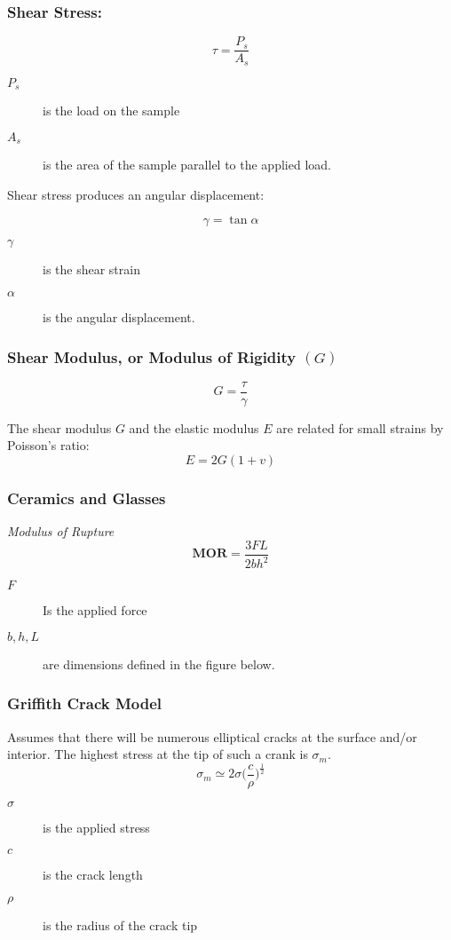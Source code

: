 \documentclass[10pt,letterpaper]{article}
\begin{document}
	\subsubsection*{Shear Stress:}
	$$
	\tau = \frac{P_s}{A_s}
	$$
	\begin{description}
		\item[$P_s$] is the load on the sample
		\item[$A_s$] is the area of the sample parallel to the applied load. 
	\end{description}
	
	Shear stress produces an angular displacement:
	
	$$
	\gamma = \tan \alpha
	$$
	\begin{description}
		\item[$\gamma$] is the shear strain
		\item[$\alpha$] is the angular displacement.
	\end{description}
	
	
	
	\subsubsection*{Shear Modulus, or Modulus of Rigidity $(G)$}
	$$
	G = \frac{\tau}{\gamma}
	$$
	
	The shear modulus $G$ and the elastic modulus $E$ are related for small strains by Poisson's ratio:
	$$
	E = 2G(1 + v)
	$$ 
	
	\subsubsection*{Ceramics and Glasses}
	\emph{Modulus of Rupture}
	$$
	\textbf{MOR} = \frac{3FL}{2bh^2}
	$$
	\begin{description}
		\item[$F$] Is the applied force
		\item[$b,h,L$] are dimensions defined in the figure below. 
	\end{description}

\subsubsection*{Griffith Crack Model}
Assumes that there will be numerous elliptical cracks at the surface and/or interior. The highest stress at the tip of such a crank is $\sigma_m$.
$$
\sigma_m \simeq 2\sigma\bigg( \frac{c}{\rho} \bigg)^{{\frac{1}{2}}}
$$
\begin{description}
	\item[$\sigma$] is the applied stress
	\item[$c$] is the crack length
	\item[$\rho$] is the radius of the crack tip
\end{description}
\end{document}
